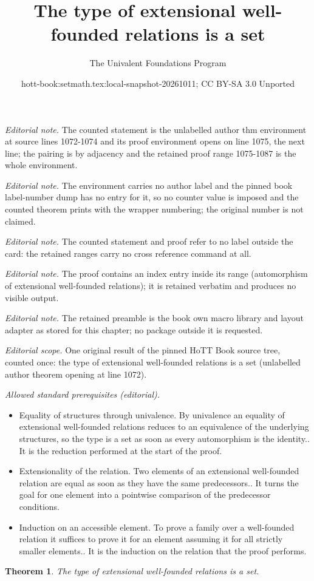 \documentclass[10pt,a4paper]{article}
\title{The type of extensional well-founded relations is a set}
\author{The Univalent Foundations Program}
\date{hott-book:setmath.tex:local-snapshot-20261011; CC BY-SA 3.0 Unported}
\newcounter{chapter}
\newtheorem{thm}{Theorem}[section]
\theoremstyle{definition}
\theoremstyle{remark}
\numberwithin{equation}{section}
\begin{document}
\maketitle
\noindent\textit{Editorial note.} The counted statement is the unlabelled author thm environment at source lines 1072-1074 and its proof environment opens on line 1075, the next line; the pairing is by adjacency and the retained proof range 1075-1087 is the whole environment.\par\medskip
\noindent\textit{Editorial note.} The environment carries no author label and the pinned book label-number dump has no entry for it, so no counter value is imposed and the counted theorem prints with the wrapper numbering; the original number is not claimed.\par\medskip
\noindent\textit{Editorial note.} The counted statement and proof refer to no label outside the card: the retained ranges carry no cross reference command at all.\par\medskip
\noindent\textit{Editorial note.} The proof contains an index entry inside its range (automorphism of extensional well-founded relations); it is retained verbatim and produces no visible output.\par\medskip
\noindent\textit{Editorial note.} The retained preamble is the book own macro library and layout adapter as stored for this chapter; no package outside it is requested.\par\medskip
\noindent\textit{Editorial scope.} One original result of the pinned HoTT Book source tree, counted once: the type of extensional well-founded relations is a set (unlabelled author theorem opening at line 1072).\par\medskip
\noindent\textit{Allowed standard prerequisites (editorial).}\begin{itemize}
\item Equality of structures through univalence. By univalence an equality of extensional well-founded relations reduces to an equivalence of the underlying structures, so the type is a set as soon as every automorphism is the identity.. It is the reduction performed at the start of the proof.
\item Extensionality of the relation. Two elements of an extensional well-founded relation are equal as soon as they have the same predecessors.. It turns the goal for one element into a pointwise comparison of the predecessor conditions.
\item Induction on an accessible element. To prove a family over a well-founded relation it suffices to prove it for an element assuming it for all strictly smaller elements.. It is the induction on the relation that the proof performs.
\end{itemize}\medskip
\begin{thm}
  The type of extensional well-founded relations is a set.
\end{thm}
\end{document}
